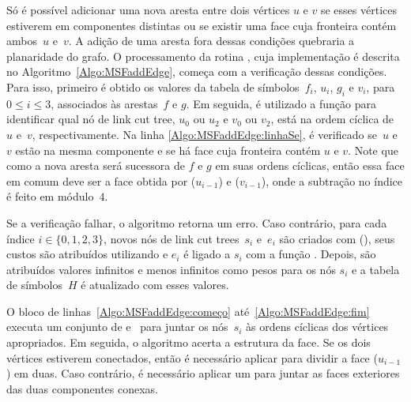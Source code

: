 Só é possível adicionar uma nova aresta entre dois vértices $u$ e $v$ se esses vértices estiverem em componentes distintas ou se existir uma face cuja fronteira contém ambos~$u$ e~$v$.
A adição de uma aresta fora dessas condições quebraria a planaridade do grafo. 
O processamento da rotina \MSFaddEdge{}, cuja implementação é descrita no Algoritmo~\ref{Algo:MSFaddEdge}, começa com a verificação dessas condições.
Para isso, primeiro é obtido os valores da tabela de símbolos~$f_i$, $u_i$, $g_i$ e $v_i$, para $0\leq i \leq 3$, associados às arestas~$f$ e $g$.
Em seguida, é utilizado a função \LCOFindNode{} para identificar qual nó de link cut tree, $u_0$ ou $u_2$ e $v_0$ ou $v_2$, está na ordem cíclica de~$u$ e~$v$, respectivamente.
Na linha \ref{Algo:MSFaddEdge:linhaSe}, é verificado se~$u$ e~$v$ estão na mesma componente e se há face cuja fronteira contém $u$ e $v$.
Note que como a nova aresta será sucessora de $f$ e $g$ em suas ordens cíclicas, então essa face em comum deve ser a face obtida por \LCOFindNode($u_{i-1}$) e \LCOFindNode($v_{i-1}$), onde a subtração no índice é feito em módulo~$4$.

Se a verificação falhar, o algoritmo retorna um erro. Caso contrário, para cada índice $i \in \{0, 1, 2, 3\}$, novos nós de link cut trees~$s_i$ e~$e_i$ são criados com \LCOMakeNode(), seus custos são atribuídos utilizando \LCOAddCost{} e $e_i$ é ligado a $s_i$ com a função \linkcutAddEdge{}.
Depois, são atribuídos valores infinitos e menos infinitos como pesos para os nós $s_i$ e a tabela de símbolos~$H$ é atualizado com esses valores.

O bloco de linhas~\ref{Algo:MSFaddEdge:começo} até~\ref{Algo:MSFaddEdge:fim} executa um conjunto de \LCOCycle{} e~\LCOMerge{} para juntar os nós~$s_i$ às ordens cíclicas dos vértices apropriados.  
Em seguida, o algoritmo acerta a estrutura da face.
Se os dois vértices estiverem conectados, então é necessário aplicar \LCOSplit{} para dividir a face \LCOFindNode($u_{i-1}$) em duas.
Caso contrário, é necessário aplicar um \LCOMerge para juntar as faces exteriores das duas componentes conexas.

